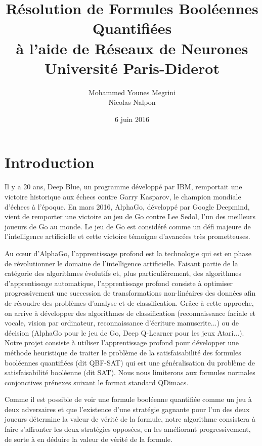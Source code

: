 \documentclass{article}
\begin{document}
\title{
    {\Large\textbf{Résolution de Formules Booléennes Quantifiées\\à l'aide de Réseaux de Neurones}}\\
	{\large Université Paris-Diderot}
}
\author{
	{Mohammed Younes Megrini}\\
	{Nicolas Nalpon}
}
\date{6 juin 2016}
\maketitle
\newpage

\tableofcontents
\newpage

\section{Introduction}
Il y a 20 ans, Deep Blue, un programme développé par IBM, remportait une victoire historique aux échecs contre Garry Kasparov, le champion mondiale d'échecs à l'époque. En mars 2016, AlphaGo, développé par Google Deepmind, vient de remporter une victoire au jeu de Go contre Lee Sedol, l'un des meilleurs joueurs de Go au monde. Le jeu de Go est considéré comme un défi majeure de l'intelligence artificielle et cette victoire témoigne d'avancées très prometteuses.

Au cœur d'AlphaGo, l'apprentissage profond est la technologie qui est en phase de révolutionner le domaine de l'intelligence artificielle. Faisant partie de la catégorie des algorithmes évolutifs et, plus particulièrement, des algorithmes d'apprentissage automatique, l'apprentissage profond consiste à optimiser progressivement une succession de transformations non-linéaires des données afin de résoudre des problèmes d'analyse et de classification. Grâce à cette approche, on arrive à développer des algorithmes de classification (reconnaissance faciale et vocale, vision par ordinateur, reconnaissance d'écriture manuscrite...) ou de décision (AlphaGo pour le jeu de Go, Deep Q-Learner pour les jeux Atari...).\\

Notre projet consiste à utiliser l'apprentissage profond pour développer une méthode heuristique de traiter le problème de la satisfaisabilité des formules booléennes quantifiées (dit QBF-SAT) qui est une généralisation du problème de satisfaisabilité booléenne (dit SAT). Nous nous limiterons aux formules normales conjonctives prénexes suivant le format standard QDimacs.

Comme il est possible de voir une formule booléenne quantifiée comme un jeu à deux adversaires et que l'existence d'une stratégie gagnante pour l'un des deux joueurs détermine la valeur de vérité de la formule, notre algorithme consistera à faire s'affronter les deux stratégies opposées, en les améliorant progressivement, de sorte à en déduire la valeur de vérité de la formule.\\
\end{document}
